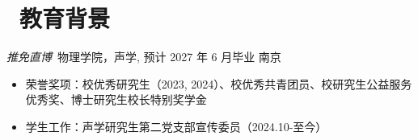 \documentclass{resume}
\begin{document}


 


\section{\  教育背景}
\begin{onehalfspacing}
\textit{推免直博}\ 物理学院，声学, 预计 2027 年 6 月毕业 \hfill 南京
\begin{itemize}
    \item 荣誉奖项：校优秀研究生（2023, 2024）、校优秀共青团员、校研究生公益服务优秀奖、博士研究生校长特别奖学金
    \item 学生工作：声学研究生第二党支部宣传委员（2024.10-至今）
\end{itemize}
\end{onehalfspacing}
\end{document}

